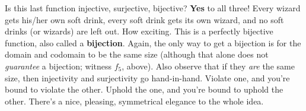 Is this last function injective, surjective, bijective? \textbf{Yes} to all
three! Every wizard gets his/her own soft drink, every soft drink gets its
own wizard, and no soft drinks (or wizards) are left out. How exciting.
This is a perfectly bijective function, also called a \textbf{bijection}.
Again, the only way to get a bijection is for the domain and codomain to be
the same size (although that alone does not \textit{guarantee} a bijection;
witness $f_5$, above). Also observe that if they \textit{are} the same
size, then injectivity and surjectivity go hand-in-hand. Violate one, and
you're bound to violate the other. Uphold the one, and you're bound to
uphold the other. There's a nice, pleasing, symmetrical elegance to the
whole idea.

